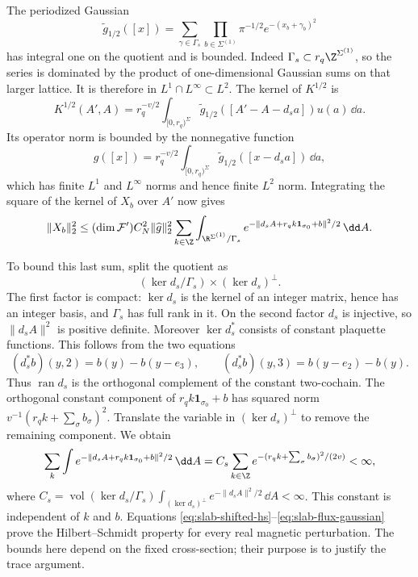 The periodized Gaussian
\[
 \widetilde g_{1/2}([x])
   =\sum_{\gamma\in\Gamma_s}\prod_{b\in\Sigma^{(1)}}
                       \pi^{-1/2}e^{-(x_b+\gamma_b)^2}
\]
has integral one on the quotient and is bounded. Indeed
$\Gamma_s\subset r_q\Z^{\Sigma^{(1)}}$, so the series is dominated
by the product of one-dimensional Gaussian sums on that larger lattice.
It is therefore in $L^1\cap L^\infty\subset L^2$. The kernel of
$K^{1/2}$ is
\[
 K^{1/2}(A',A)=r_q^{-v/2}\int_{[0,r_q)^{\Sigma}}
       \widetilde g_{1/2}([A'-A-d_sa])u(a)\,\dd a.
\]
Its operator norm is bounded by the nonnegative function
\[
 \widehat g([x])=r_q^{-v/2}\int_{[0,r_q)^{\Sigma}}
                  \widetilde g_{1/2}([x-d_sa])\,\dd a,
\]
which has finite $L^1$ and $L^\infty$ norms and hence finite $L^2$ norm.
Integrating the square of the kernel of $X_b$ over $A'$ now gives
\begin{equation}\label{eq:slab-shifted-hs}
 \|X_b\|_2^2\le
    (\dim\mathcal F')C_N^2\|\widehat g\|_2^2
       \sum_{k\in\Z}\int_{\R^{\Sigma^{(1)}}/\Gamma_s}
             e^{-\|d_sA+r_qk\mathbf1_{\sigma_0}+b\|^2/2}\,\dd A.
\end{equation}

To bound this last sum, split the quotient as
\[
 (\ker d_s/\Gamma_s)\times(\ker d_s)^\perp.
\]
The first factor is compact: $\ker d_s$ is the kernel of an integer
matrix, hence has an integer basis, and $\Gamma_s$ has full rank in
it. On the second factor $d_s$ is injective, so
$\|d_sA\|^2$ is positive definite. Moreover
$\ker d_s^*$ consists of constant plaquette functions. This follows
from the two equations
\[
 (d_s^*b)(y,2)=b(y)-b(y-e_3),\qquad
 (d_s^*b)(y,3)=b(y-e_2)-b(y).
\]
Thus $\operatorname{ran}d_s$ is the orthogonal complement of the
constant two-cochain. The orthogonal constant component of
$r_qk\mathbf1_{\sigma_0}+b$ has squared norm
$v^{-1}(r_qk+\sum_\sigma b_\sigma)^2$. Translate the variable in
$(\ker d_s)^\perp$ to remove the remaining component. We obtain
\begin{equation}\label{eq:slab-flux-gaussian}
 \sum_k\int e^{-\|d_sA+r_qk\mathbf1_{\sigma_0}+b\|^2/2}\,\dd A
    =C_s\sum_{k\in\Z}
               e^{-(r_qk+\sum_\sigma b_\sigma)^2/(2v)}<\infty,
\end{equation}
where
$C_s=\operatorname{vol}(\ker d_s/\Gamma_s)
\int_{(\ker d_s)^\perp}e^{-\|d_sA\|^2/2}\,\dd A<\infty$.
This constant is independent of $k$ and $b$. Equations
\eqref{eq:slab-shifted-hs}--\eqref{eq:slab-flux-gaussian} prove the
Hilbert--Schmidt property for every real magnetic perturbation. The
bounds here depend on the fixed cross-section; their purpose is to
justify the trace argument.

